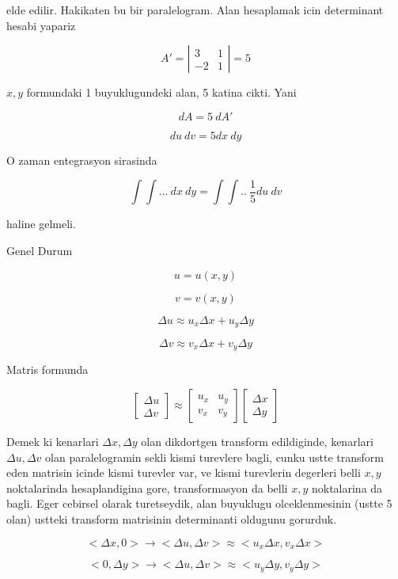 \documentclass[12pt,fleqn]{article}\usepackage{../common}
\begin{document}
elde edilir. Hakikaten bu bir paralelogram. Alan hesaplamak icin
determinant hesabi yapariz

\[ A' = 
\left|\begin{array}{rr}
3 & 1 \\
-2 & 1
\end{array}\right| = 5
 \]

$x,y$ formundaki 1 buyuklugundeki alan, 5 katina cikti. Yani 

\[ dA = 5 \ dA' \]

\[ du \ dv = 5 dx \ dy \]

O zaman entegrasyon sirasinda 

\[ \int \int ... \ dx \ dy = \int \int .. \ \frac{1}{5} du \ dv \]

haline gelmeli. 

Genel Durum 

\[ u = u(x,y) \]

\[ v = v(x,y)  \]

\[ \Delta u \approx u_x \Delta x + u_y \Delta y  \]

\[ \Delta v \approx v_x \Delta x + v_y \Delta y  \]

Matris formunda 

\[ 
\left[\begin{array}{r}
\Delta u \\
\Delta v 
\end{array}\right] \approx 
\left[\begin{array}{rr}
u_x & u_y \\
v_x & v_y
\end{array}\right] 
\left[\begin{array}{r}
\Delta x \\
\Delta y 
\end{array}\right] 
 \]

Demek ki kenarlari $\Delta x,\Delta y$ olan dikdortgen transform
edildiginde, kenarlari $\Delta u,\Delta v$ olan paralelogramin sekli kismi
turevlere bagli, cunku ustte transform eden matrisin icinde kismi turevler
var, ve kismi turevlerin degerleri belli $x,y$ noktalarinda hesaplandigina
gore, transformasyon da belli $x,y$ noktalarina da bagli. Eger cebirsel
olarak turetseydik, alan buyuklugu olceklenmesinin (ustte 5 olan) ustteki
transform matrisinin determinanti oldugunu gorurduk. 

\[<\Delta x,0> \to <\Delta u, \Delta v> \approx <u_x \Delta x, v_x\Delta x> \]

\[ <0, \Delta y> \to <\Delta u,\Delta v> \approx <u_y\Delta y,v_y \Delta y> \]
\end{document}
